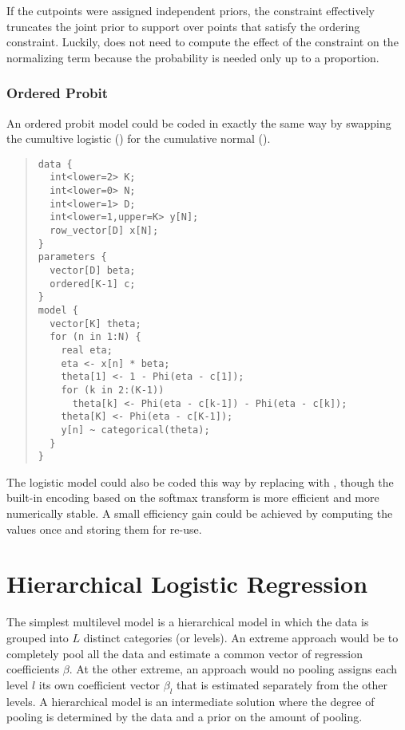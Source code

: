 If the cutpoints were assigned independent priors, the constraint
effectively truncates the joint prior to support over points that
satisfy the ordering constraint.  Luckily, \Stan does not need to
compute the effect of the constraint on the normalizing term because
the probability is needed only up to a proportion.


\subsubsection{Ordered Probit}

An ordered probit model could be coded in exactly the same way by
swapping the cumultive logistic () for the cumulative
normal ().
%
\begin{quote}
\begin{Verbatim}[fontsize=\small]
data {
  int<lower=2> K;
  int<lower=0> N;
  int<lower=1> D;
  int<lower=1,upper=K> y[N];
  row_vector[D] x[N];
}
parameters {
  vector[D] beta;
  ordered[K-1] c;
}
model {
  vector[K] theta;
  for (n in 1:N) {
    real eta;
    eta <- x[n] * beta;
    theta[1] <- 1 - Phi(eta - c[1]);
    for (k in 2:(K-1))
      theta[k] <- Phi(eta - c[k-1]) - Phi(eta - c[k]);
    theta[K] <- Phi(eta - c[K-1]);
    y[n] ~ categorical(theta);
  }
}
\end{Verbatim}
\end{quote}
%
The logistic model could also be coded this way by replacing
 with , though the built-in encoding based
on the softmax transform is more efficient and more numerically
stable.  A small efficiency gain could be achieved by computing the
values  once and storing them for re-use.


\section{Hierarchical Logistic Regression}

The simplest multilevel model is a hierarchical model in which the
data is grouped into $L$ distinct categories (or levels).  An extreme approach would be to
completely pool all the data and estimate a common vector of
regression coefficients $\beta$.  At the other extreme, an approach
would no pooling assigns each level $l$ its own coefficient vector
$\beta_l$ that is estimated separately from the other levels.  A
hierarchical model is an intermediate solution where the degree of
pooling is determined by the data and a prior on the amount of
pooling.

